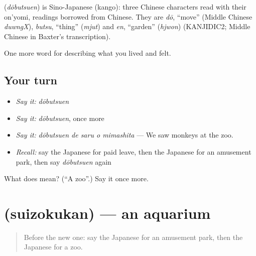 \begin{cousinweb}
\textbf{} (\emph{dōbutsuen}) is Sino-Japanese (kango): three Chinese characters read with their on'yomi, readings borrowed from Chinese. They are \emph{dō}, \textquotedblleft{}move\textquotedblright{} (Middle Chinese \emph{duwngX}), \emph{butsu}, \textquotedblleft{}thing\textquotedblright{} (\emph{mjut}) and \emph{en}, \textquotedblleft{}garden\textquotedblright{} (\emph{hjwon}) (KANJIDIC2; Middle Chinese in Baxter's transcription).
\end{cousinweb}

\begin{grammarlens}[title={What you've built}]
One more word for describing what you lived and felt.
\end{grammarlens}

\subsection*{Your turn}
\begin{itemize}
\raggedright
  \item \emph{Say it:} \emph{dōbutsuen}
  \item \emph{Say it:} \emph{dōbutsuen}, once more
  \item \emph{Say it:} \emph{dōbutsuen de saru o mimashita} — We saw monkeys at the zoo.
  \item \emph{Recall:} say the Japanese for paid leave, then the Japanese for an amusement park, then say \emph{dōbutsuen} again
\end{itemize}

\begin{tcolorbox}[breakable,colback=teal!4,colframe=teal!35!black,title={Before you move on}]
What does  mean? (\textquotedblleft{}A zoo\textquotedblright{}.) Say it once more.
\end{tcolorbox}
\section[\texorpdfstring{\ja{すいぞくかん} (suizokukan)}{すいぞくかん (suizokukan)}]{ (suizokukan) — an aquarium}

\label{lesson:JA-C499-suizokukan}



\begin{quote}
Before the new one: say the Japanese for an amusement park, then the Japanese for a zoo.
\end{quote}

